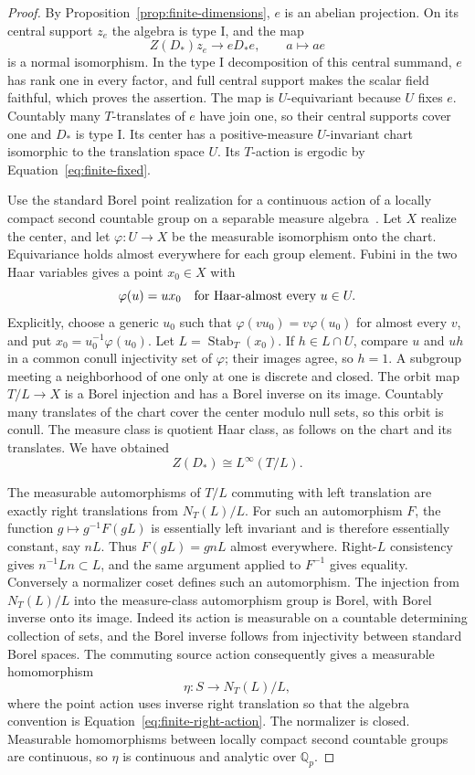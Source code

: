 \begin{proof}
By Proposition~\ref{prop:finite-dimensions}, $e$ is an abelian
projection.  On its central support $z_e$ the algebra is type I,
and the map
\begin{equation}
 Z(D_*)z_e\longrightarrow eD_*e,\qquad a\longmapsto ae
 \label{eq:finite-center-corner}
\end{equation}
is a normal isomorphism.  In the type I decomposition of this
central summand, $e$ has rank one in every factor, and full central
support makes the scalar field faithful, which proves the assertion.
The map is $U$-equivariant because $U$ fixes $e$.
Countably many $T$-translates of $e$ have join one, so their central
supports cover one and $D_*$ is type I.
Its center has a positive-measure $U$-invariant chart isomorphic
to the translation space $U$.  Its $T$-action is ergodic by
Equation~\eqref{eq:finite-fixed}.

Use the standard Borel point realization for a continuous action
of a locally compact second countable group on a separable measure
algebra~\cite{Mackey1962}.  Let $X$ realize the center, and let
$\varphi:U\to X$ be the measurable isomorphism onto the chart.
Equivariance holds almost everywhere for each group element.
Fubini in the two Haar variables gives a point $x_0\in X$ with
\[
 \varphi(u)=ux_0\quad\hbox{for Haar-almost every }u\in U.
\]
Explicitly, choose a generic $u_0$ such that
$\varphi(vu_0)=v\varphi(u_0)$ for almost every $v$, and put
$x_0=u_0^{-1}\varphi(u_0)$.
Let $L=\operatorname{Stab}_T(x_0)$.
If $h\in L\cap U$, compare $u$ and $uh$ in a common conull
injectivity set of $\varphi$; their images agree, so $h=1$.
A subgroup meeting a neighborhood of one only at one is discrete
and closed.  The orbit map $T/L\to X$ is a Borel injection and
has a Borel inverse on its image.  Countably many translates of
the chart cover the center modulo null sets, so this orbit is
conull.  The measure class is quotient Haar class, as follows on
the chart and its translates.  We have obtained
\[
 Z(D_*)\cong L^\infty(T/L).
\]

The measurable automorphisms of $T/L$ commuting with left
translation are exactly right translations from $N_T(L)/L$.
For such an automorphism $F$, the function
$g\mapsto g^{-1}F(gL)$ is essentially left invariant and is
therefore essentially constant, say $nL$.
Thus $F(gL)=gnL$ almost everywhere.  Right-$L$ consistency gives
$n^{-1}Ln\subset L$, and the same argument applied to $F^{-1}$
gives equality.  Conversely a normalizer coset defines such an
automorphism.  The injection from $N_T(L)/L$ into the
measure-class automorphism group is Borel, with Borel inverse
onto its image.  Indeed its action is measurable on a countable
determining collection of sets, and the Borel inverse follows
from injectivity between standard Borel spaces.
The commuting source action consequently gives a measurable
homomorphism
\[
 \eta:S\longrightarrow N_T(L)/L,
\]
where the point action uses inverse right translation so that
the algebra convention is Equation~\eqref{eq:finite-right-action}.
The normalizer is closed.  Measurable homomorphisms between
locally compact second countable groups are continuous, so
$\eta$ is continuous and analytic over $\mathbb Q_p$.


\end{proof}
